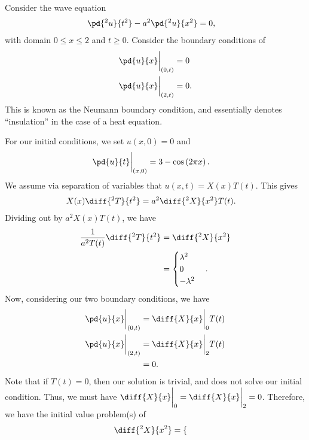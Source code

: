 \documentclass[10pt]{mypackage}
\begin{document}
\begin{example}
  Consider the wave equation
  \begin{align*}
    \pd{^2u}{t^2} - a^2 \pd{^2u}{x^2} &= 0,
  \end{align*}
  with domain $0 \leq x \leq 2$ and $t\geq 0$. Consider the boundary conditions of
  \begin{align*}
    \pd{u}{x}\biggr\vert_{(0,t)} &= 0\\
    \pd{u}{x}\biggr\vert_{(2,t)} &= 0.
  \end{align*}
  This is known as the Neumann boundary condition, and essentially denotes ``insulation'' in the case of a heat equation.\newline

  For our initial conditions, we set $u\left( x,0 \right) = 0$ and
  \begin{align*}
    \pd{u}{t}\biggr\vert_{(x,0)} &= 3-\cos\left( 2\pi x \right).
  \end{align*}
  We assume via separation of variables that $u\left( x,t \right) = X(x)T(t)$. This gives
  \begin{align*}
    X(x)\diff{^2T}{t^2} &= a^2 \diff{^2X}{x^2}T(t).
  \end{align*}
  Dividing out by $a^2X(x)T(t)$, we have
  \begin{align*}
    \frac{1}{a^2T(t)} \diff{^2T}{t^2} &= \diff{^2X}{x^2}\\
                                      &= \begin{cases}
                                        \lambda^2\\0\\-\lambda^2
                                      \end{cases}.
  \end{align*}
  Now, considering our two boundary conditions, we have
  \begin{align*}
    \pd{u}{x}\biggr\vert_{(0,t)} &= \diff{X}{x}\biggr\vert_{0}T(t)\\
    \pd{u}{x}\biggr\vert_{(2,t)} &= \diff{X}{x}\biggr\vert_{2}T(t)\\
                                 &= 0.
  \end{align*}
  Note that if $T(t) = 0$, then our solution is trivial, and does not solve our initial condition. Thus, we must have $\diff{X}{x}\biggr\vert_{0} = \diff{X}{x}\biggr\vert_{2} = 0$. Therefore, we have the initial value problem(s) of
  \begin{align*}
    \diff{^2X}{x^2} &= \begin{cases}

\end{cases}
\end{align*}
\end{example}
\end{document}
